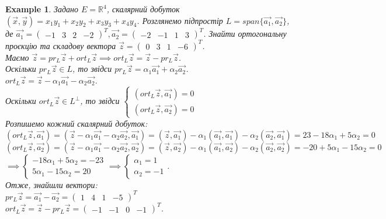 \documentclass[a4paper, 10pt]{article}
\theoremstyle{theoremdd}
\newtheorem{example}[theorem]{Example}
\begin{document}
\begin{example}
Задано $E = \mathbb{R}^4$, скалярний добуток $(\vec{x},\vec{y}) = x_1y_1+x_2y_2+x_3y_3+x_4y_4$. Розглянемо підпростір $L = span\{ \vec{a_1}, \vec{a_2} \}$, де $\vec{a_1} = \begin{pmatrix}
-1 & 3 & 2 & -2
\end{pmatrix}^T, \vec{a_2} = \begin{pmatrix}
-2 & -1 & 1 & 3
\end{pmatrix}^T$. Знайти ортогональну проєкцію та складову вектора $\vec{z} = \begin{pmatrix}
0 & 3 & 1 & -6
\end{pmatrix}^T$.\\
Маємо $\vec{z} = pr_L \vec{z} + ort_L \vec{z} \implies ort_L \vec{z} = \vec{z} - pr_L \vec{z}$.\\
Оскільки $pr_L \vec{z} \in L$, то звідси $pr_L \vec{z} = \alpha_1 \vec{a_1} + \alpha_2 \vec{a_2}$.\\
$ort_L \vec{z} = \vec{z} - \alpha_1 \vec{a_1} - \alpha_2 \vec{a_2}$.\\
Оскільки $ort_L \vec{z} \in L^\perp$, то звідси $\begin{cases} (ort_L \vec{z}, \vec{a_1}) = 0 \\ (ort_L \vec{z}, \vec{a_2}) = 0 \end{cases}$\\
Розпишемо кожний скалярний добуток:\\
$(ort_L \vec{z}, \vec{a_1}) = (\vec{z} - \alpha_1 \vec{a_1} - \alpha_2 \vec{a_2}, \vec{a_1}) = (\vec{z}, \vec{a_1}) - \alpha_1 (\vec{a_1},\vec{a_1}) - \alpha_2 (\vec{a_2}, \vec{a_1}) = 23 - 18 \alpha_1 +5\alpha_2 = 0$\\
$(ort_L \vec{z}, \vec{a_2}) = (\vec{z} - \alpha_1 \vec{a_1} - \alpha_2 \vec{a_2}, \vec{a_2}) = (\vec{z}, \vec{a_2}) - \alpha_1 (\vec{a_1},\vec{a_2}) - \alpha_2 (\vec{a_2}, \vec{a_2}) = -20 +5 \alpha_1 - 15 \alpha_2 = 0$\\
$\implies \begin{cases} -18\alpha_1 + 5\alpha_2 = -23 \\ 5\alpha_1-15\alpha_2 = 20  \end{cases} \implies \begin{cases} \alpha_1 = 1 \\ \alpha_2 = -1 \end{cases}$.\\
Отже, знайшли вектори: \\
$pr_L \vec{z} = \vec{a_1} - \vec{a_2} = \begin{pmatrix}
1 & 4 & 1 & -5
\end{pmatrix}^T$\\
$ort_L \vec{z} = \vec{z} - pr_L \vec{z} = \begin{pmatrix}
-1 & -1 & 0 & -1
\end{pmatrix}^T$.
\end{example}
\end{document}
